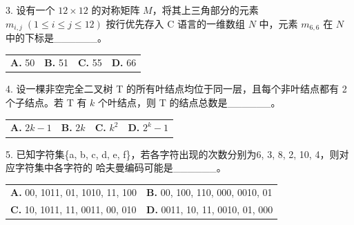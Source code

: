 \documentclass[UTF8,11pt]{ctexart}
\begin{document}
3. 设有一个 \(\displaystyle 12\times12\) 的对称矩阵 \(\displaystyle M\)，将其上三角部分的元素 \(\displaystyle m_{i,\allowbreak j}\;(1\le i\le j\le12)\) 按行优先存入 C 语言的一维数组 \(\displaystyle N\) 中，元素 \(\displaystyle m_{6,\allowbreak 6}\) 在 \(\displaystyle N\) 中的下标是\_\_\_\_\_\_。


\begin{center}\begin{tabular}{>{\raggedright\arraybackslash}p{\dimexpr(\linewidth-8\tabcolsep)/4\relax}>{\raggedright\arraybackslash}p{\dimexpr(\linewidth-8\tabcolsep)/4\relax}>{\raggedright\arraybackslash}p{\dimexpr(\linewidth-8\tabcolsep)/4\relax}>{\raggedright\arraybackslash}p{\dimexpr(\linewidth-8\tabcolsep)/4\relax}}
\textbf{A.} 50 & \textbf{B.} 51 & \textbf{C.} 55 & \textbf{D.} 66\\[.35em]\end{tabular}\end{center}

4. 设一棵非空完全二叉树 T 的所有叶结点均位于同一层，且每个非叶结点都有 2 个子结点。若 T 有 \(\displaystyle k\) 个叶结点，则 T 的结点总数是\_\_\_\_\_\_。


\begin{center}\begin{tabular}{>{\raggedright\arraybackslash}p{\dimexpr(\linewidth-8\tabcolsep)/4\relax}>{\raggedright\arraybackslash}p{\dimexpr(\linewidth-8\tabcolsep)/4\relax}>{\raggedright\arraybackslash}p{\dimexpr(\linewidth-8\tabcolsep)/4\relax}>{\raggedright\arraybackslash}p{\dimexpr(\linewidth-8\tabcolsep)/4\relax}}
\textbf{A.} \(\displaystyle 2k-1\) & \textbf{B.} \(\displaystyle 2k\) & \textbf{C.} \(\displaystyle k^2\) & \textbf{D.} \(\displaystyle 2^k-1\)\\[.35em]\end{tabular}\end{center}

5. 已知字符集\{a, b, c, d, e, f\}，若各字符出现的次数分别为6, 3, 8, 2, 10, 4，则对应字符集中各字符的 哈夫曼编码可能是\_\_\_\_\_\_。


\begin{center}\begin{tabular}{>{\raggedright\arraybackslash}p{\dimexpr(\linewidth-4\tabcolsep)/2\relax}>{\raggedright\arraybackslash}p{\dimexpr(\linewidth-4\tabcolsep)/2\relax}}
\textbf{A.} 00, 1011, 01, 1010, 11, 100 & \textbf{B.} 00, 100, 110, 000, 0010, 01\\[.35em]
\textbf{C.} 10, 1011, 11, 0011, 00, 010 & \textbf{D.} 0011, 10, 11, 0010, 01, 000\\[.35em]\end{tabular}\end{center}
\end{document}
